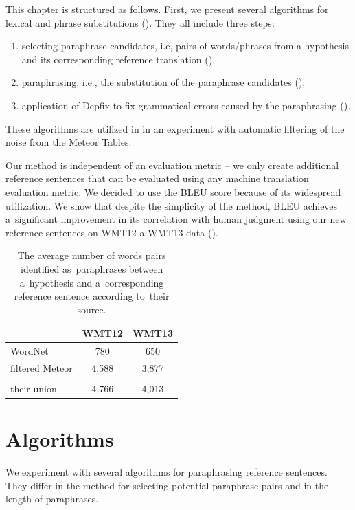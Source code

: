 This chapter is structured as follows. First, we present several algorithms for lexical 
and phrase substitutions (). They all include three steps:

\begin{enumerate}
\item selecting paraphrase candidates, i.e, pairs of words/phrases from a hypothesis
and its corresponding reference translation (), 
\item paraphrasing, i.e., the substitution of the paraphrase candidates (),
\item application of Depfix to fix grammatical errors caused by the paraphrasing 
().
\end{enumerate}

These algorithms are utilized in  in an experiment with automatic 
filtering of the noise from the Meteor Tables. 

Our method is independent of an evaluation metric -- we only create additional 
reference sentences that can be evaluated using any machine translation evaluation
metric. We decided to use the BLEU \citep{bleu} score because of its widespread 
utilization.  We show that despite the simplicity of the method, BLEU achieves 
a~significant improvement in its correlation with human judgment using our new 
reference sentences on WMT12 a WMT13 data ().

\begin{table}[t]
\begin{center}
\begin{tabular}{lcc}
& \textbf{WMT12} & \textbf{WMT13} \\
\hline
\multicolumn{1}{l|}{WordNet}      &  \multicolumn{1}{c|}{780} & 650 \\
\multicolumn{1}{l|}{filtered Meteor}   & \multicolumn{1}{c|}{4,588} & 3,877 \\
\hline
\multicolumn{3}{c}{} \\[-14pt]
\hline
\multicolumn{1}{l|}{their union}       & \multicolumn{1}{c|}{4,766} & 4,013 \\
\end{tabular}
\caption{The average number of words pairs identified as~paraphrases between 
a~hypothesis and a~corresponding reference sentence according to~their source.}
\label{number_of_substitutions}
\end{center}
\end{table}


\section{Algorithms}
\label{algorithm}
We experiment with several algorithms for paraphrasing reference sentences. 
They differ in the method for selecting potential paraphrase pairs and in the 
length of paraphrases.

